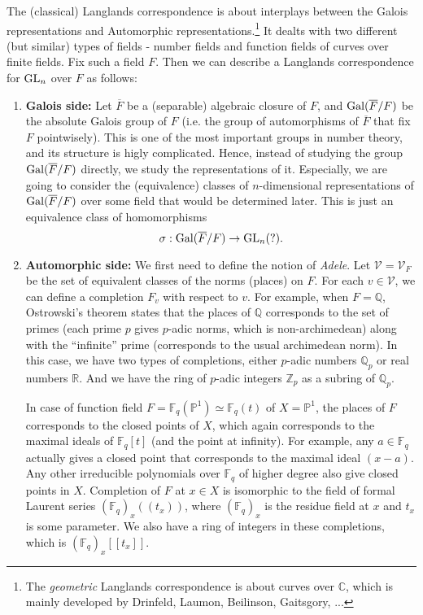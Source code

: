 The (classical) Langlands correspondence is about interplays between the Galois representations and Automorphic representations.\footnote{The \emph{geometric} Langlands correspondence is about curves over $\mathbb{C}$, which is mainly developed by Drinfeld, Laumon, Beilinson, Gaitsgory, ...}
It dealts with two different (but similar) types of fields - number fields and function fields of curves over finite fields.
Fix such a field $F$.
Then we can describe a Langlands correspondence for $\operatorname{\mathrm{GL}}_{n}$ over $F$ as follows:
\begin{enumerate}
    \item \textbf{Galois side:} Let $\overline{F}$ be a (separable) algebraic closure of $F$, and $\operatorname{\mathrm{Gal}}(\overline{F}/F)$ 
    be the absolute Galois group of $F$ (i.e. the group of automorphisms of $\overline{F}$ that fix $F$ pointwisely).
    This is one of the most important groups in number theory, and its structure is higly complicated.
    Hence, instead of studying the group $\operatorname{\mathrm{Gal}}(\overline{F}/F)$ directly, we study the representations of it.
    Especially, we are going to consider the (equivalence) classes of $n$-dimensional representations of $\operatorname{\mathrm{Gal}}(\overline{F} / F)$ over some field that would be determined later.    
    This is just an equivalence class of homomorphisms
    $$
        \sigma: \operatorname{\mathrm{Gal}}(\overline{F} / F) \to \operatorname{\mathrm{GL}}_{n}(?).
    $$
    \item \textbf{Automorphic side:} We first need to define the notion of \emph{Adele}.
    Let $\mathscr{V} = \mathscr{V}_{F}$ be the set of equivalent classes of the norms (places) on $F$.
    For each $v \in \mathscr{V}$, we can define a completion $F_{v}$ with respect to $v$.
    For example, when $F = \mathbb{Q}$, Ostrowski's theorem states that the places of $\mathbb{Q}$ corresponds to
    the set of primes (each prime $p$ gives $p$-adic norms, which is non-archimedean) along with the ``infinite'' prime (corresponds to the usual archimedean norm).
    In this case, we have two types of completions, either $p$-adic numbers $\mathbb{Q}_{p}$ or real numbers $\mathbb{R}$.
    And we have the ring of $p$-adic integers $\mathbb{Z}_{p}$ as a subring of $\mathbb{Q}_{p}$.

    In case of function field $F =\mathbb{F}_{q}(\mathbb{P}^{1}) \simeq \mathbb{F}_{q}(t)$ of $X = \mathbb{P}^{1}$,
    the places of $F$ corresponds to the closed points of $X$, which again corresponds to
    the maximal ideals of $\mathbb{F}_{q}[t]$ (and the point at infinity).
    For example, any $a \in \mathbb{F}_{q}$ actually gives a closed point that corresponds to
    the maximal ideal $(x-a)$.
    Any other irreducible polynomials over $\mathbb{F}_{q}$ of higher degree also give closed points in $X$.
    Completion of $F$ at $x \in X$ is isomorphic to the field of formal Laurent series $(\mathbb{F}_{q})_{x}((t_{x}))$,
    where $(\mathbb{F}_{q})_x$ is the residue field at $x$ and $t_{x}$ is some parameter.
    We also have a ring of integers in these completions, which is $(\mathbb{F}_{q})_{x}[[t_{x}]]$.


\end{enumerate}
